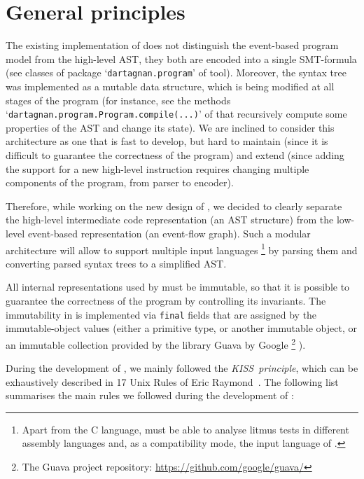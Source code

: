 \section{General principles}
\label{ch:impl:principles}

The existing implementation of \porthos{} does not distinguish the event-based program model from the high-level AST, they both are encoded into a single SMT-formula (see classes of package `\texttt{dartagnan.program}' of \porthos{} tool).
Moreover, the syntax tree was implemented as a mutable data structure, which is being modified at all stages of the program (for instance, see the methods `\texttt{dartagnan.program.Program.compile(...)}' of \porthos{} that recursively compute some properties of the AST and change its state).
We are inclined to consider this architecture as one that is fast to develop, but hard to maintain (since it is difficult to guarantee the correctness of the program) and extend (since adding the support for a new high-level instruction requires changing multiple components of the program, from parser to encoder).

Therefore, while working on the new design of \porthos[2], we decided to clearly separate the high-level intermediate code representation (an AST structure) from the low-level event-based representation (an event-flow graph).
Such a modular architecture will allow to support multiple input languages%
%
\footnote{Apart from the C language, \porthos[2] must be able to analyse litmus tests in different assembly languages and, as a compatibility mode, the input language of \porthos[1].} %
%
by parsing them and converting parsed syntax trees to a simplified AST.

All internal representations used by \porthos[2] must be immutable, so that it is possible to guarantee the correctness of the program by controlling its invariants.
The immutability in \porthos[2] is implemented via \texttt{final} fields that are assigned by the immutable-object values (either a primitive type, or another immutable object, or an immutable collection provided by the library Guava by Google%
%
\footnote{The Guava project repository: \url{https://github.com/google/guava/}}%
%
).

During the development of \porthos[2], we mainly followed the \textit{KISS~principle}, which can be exhaustively described in 17 Unix Rules of Eric Raymond~\cite{raymond2003art}.
The following list summarises the main rules we followed during the development of \porthos[2]:

